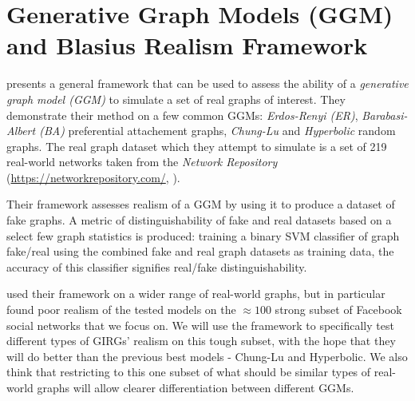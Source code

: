 \chapter{Generative Graph Models (GGM) and Blasius Realism Framework}
\label{chap:GGM}
\minitoc


\cite{blasius2018towards} presents a general framework that can be used to assess the ability of a \textit{generative graph model (GGM)} to simulate a set of real graphs of interest. They demonstrate their method on a few common GGMs: \textit{Erdos-Renyi (ER)}, \textit{Barabasi-Albert (BA)} preferential attachement graphs, \textit{Chung-Lu} and \textit{Hyperbolic} random graphs. The real graph dataset which they attempt to simulate is a set of 219 real-world networks taken from the \textit{Network Repository} (\url{https://networkrepository.com/}, \cite{rossi2015network}).

Their framework assesses realism of a GGM by using it to produce a dataset of fake graphs. A metric of distinguishability of fake and real datasets based on a select few graph statistics is produced: training a binary SVM classifier of graph \textrightarrow fake/real using the combined fake and real graph datasets as training data, the accuracy of this classifier signifies real/fake distinguishability.

\cite{blasius2018towards} used their framework on a wider range of real-world graphs, but in particular found poor realism of the tested models on the $\approx 100$ strong subset of Facebook social networks that we focus on. We will use the framework to specifically test different types of GIRGs' realism on this tough subset, with the hope that they will do better than the previous best models - Chung-Lu and Hyperbolic. We also think that restricting to this one subset of what should be similar types of real-world graphs will allow clearer differentiation between different GGMs.



